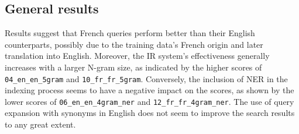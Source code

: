 
\subsection{General results}\label{subsec:general-results}

Results suggest that French queries perform better than their English counterparts, possibly due to the training data's
French origin and later translation into English.
Moreover, the IR system's effectiveness generally increases with a larger N-gram size, as indicated by the higher scores
of \texttt{04\_en\_en\_5gram} and \texttt{10\_fr\_fr\_5gram}.
Conversely, the inclusion of NER in the indexing process seems to have a negative impact on the scores, as shown by the
lower scores of \texttt{06\_en\_en\_4gram\_ner} and \texttt{12\_fr\_fr\_4gram\_ner}.
The use of query expansion with synonyms in English does not seem to improve the search results to any great extent.\\

